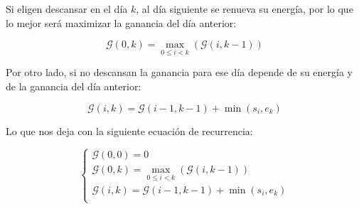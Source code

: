 Si eligen descansar en el d\'ia $k$, al d\'ia siguiente se renueva su
energ\'ia, por lo que lo mejor ser\'a maximizar la ganancia del d\'ia anterior:

\begin{equation*}
    \mathcal{G} \left( 0, k \right) = \max_{0 \le i < k} \left( \mathcal{G} \left( i, k - 1 \right) \right)
\end{equation*}

Por otro lado, si no descansan la ganancia para ese d\'ia depende de su
energ\'ia y de la ganancia del d\'ia anterior:

\begin{equation*}
    \mathcal{G} \left( i, k \right) = \mathcal{G} \left( i - 1, k - 1 \right) + \min \left( s_i, e_k \right)
\end{equation*}

Lo que nos deja con la siguiente ecuaci\'on de recurrencia:

\begin{equation}
    \begin{cases}
        \mathcal{G} \left( 0, 0 \right) = 0\\
        \mathcal{G} \left( 0, k \right) = \max_{0 \le i < k} \left( \mathcal{G} \left( i, k - 1 \right) \right)\\
        \mathcal{G} \left( i, k \right) = \mathcal{G} \left( i - 1, k - 1 \right) + \min \left( s_i, e_k \right)\\
    \end{cases}
\end{equation}
